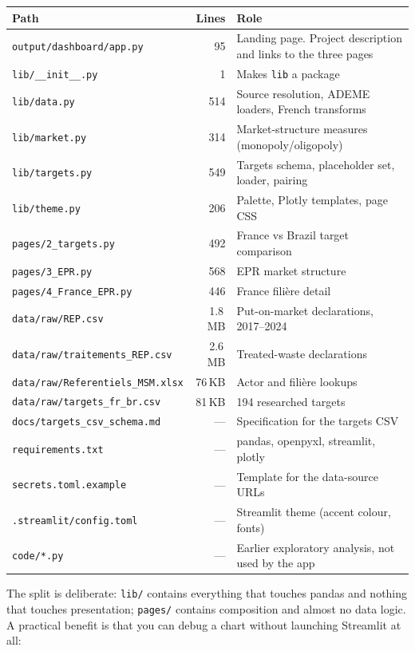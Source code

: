 \documentclass[11pt,a4paper]{article}
\newcommand{\file}[1]{\texttt{#1}}
\begin{document}
\begin{longtable}{@{}L{5.6cm}rL{7.2cm}@{}}
\toprule
\textbf{Path} & \textbf{Lines} & \textbf{Role} \\
\midrule
\endhead
\file{output/dashboard/app.py} & 95 & Landing page. Project description and
links to the three pages \\
\file{lib/\_\_init\_\_.py} & 1 & Makes \file{lib} a package \\
\file{lib/data.py} & 514 & Source resolution, ADEME loaders, French transforms \\
\file{lib/market.py} & 314 & Market-structure measures (monopoly/oligopoly) \\
\file{lib/targets.py} & 549 & Targets schema, placeholder set, loader, pairing \\
\file{lib/theme.py} & 206 & Palette, Plotly templates, page CSS \\
\file{pages/2\_targets.py} & 492 & France vs Brazil target comparison \\
\file{pages/3\_EPR.py} & 568 & EPR market structure \\
\file{pages/4\_France\_EPR.py} & 446 & France filière detail \\
\midrule
\file{data/raw/REP.csv} & 1.8\,MB & Put-on-market declarations, 2017--2024 \\
\file{data/raw/traitements\_REP.csv} & 2.6\,MB & Treated-waste declarations \\
\file{data/raw/Referentiels\_MSM.xlsx} & 76\,KB & Actor and filière lookups \\
\file{data/raw/targets\_fr\_br.csv} & 81\,KB & 194 researched targets \\
\midrule
\file{docs/targets\_csv\_schema.md} & --- & Specification for the targets CSV \\
\file{requirements.txt} & --- & pandas, openpyxl, streamlit, plotly \\
\file{secrets.toml.example} & --- & Template for the data-source URLs \\
\file{.streamlit/config.toml} & --- & Streamlit theme (accent colour, fonts) \\
\file{code/*.py} & --- & Earlier exploratory analysis, not used by the app \\
\bottomrule
\end{longtable}

The split is deliberate: \file{lib/} contains everything that touches pandas and
nothing that touches presentation; \file{pages/} contains composition and almost
no data logic. A practical benefit is that you can debug a chart without
launching Streamlit at all:
\end{document}
